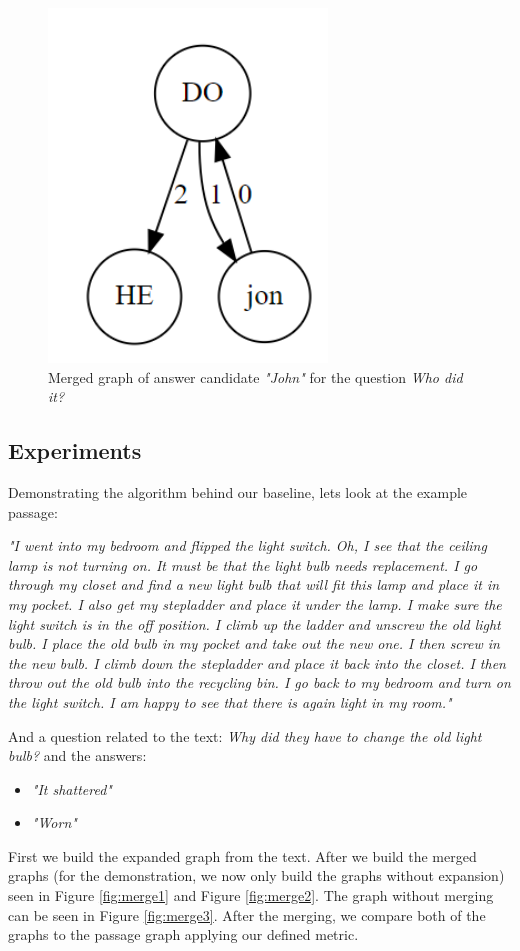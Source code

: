 \begin{figure}
	\centering
	\includegraphics[scale=0.3]{figures/merge}
	\caption{Merged graph of answer candidate \textit{"John"} for the
		question \textit{Who did it?}}
	\label{fig:merge}
\end{figure}

\subsection{Experiments}
\label{sec:exp}

Demonstrating the algorithm behind our baseline, lets look at the example passage:
\begin{center}
	\textit{ "I went into my bedroom and flipped the light switch. Oh, I see that the ceiling lamp is not turning on. It must be that the light bulb needs replacement. I go through my closet and find a new light bulb that will fit this lamp and place it in my pocket. I also get my stepladder and place it under the lamp. I make sure the light switch is in the off position. I climb up the ladder and unscrew the old light bulb. I place the old bulb in my pocket and take out the new one. I then screw in the new bulb. I climb down the stepladder and place it back into the closet. I then throw out the old bulb into the recycling bin. I go back to my bedroom and turn on the light switch. I am happy to see that there is again light in my room."}
\end{center}
And a question related to the text: \textit{Why did they have to change the old light bulb?} and the answers:
\begin{itemize}
	\item \textit{"It shattered"}
	\item \textit{"Worn"}
\end{itemize}
First we build the expanded graph from the text. After we build the merged graphs (for the demonstration, we now only build the graphs without expansion) seen in Figure \ref{fig:merge1} and Figure \ref{fig:merge2}. The graph without merging can be seen in Figure \ref{fig:merge3}. After the merging, we compare both of the graphs to the passage graph applying our defined metric.

